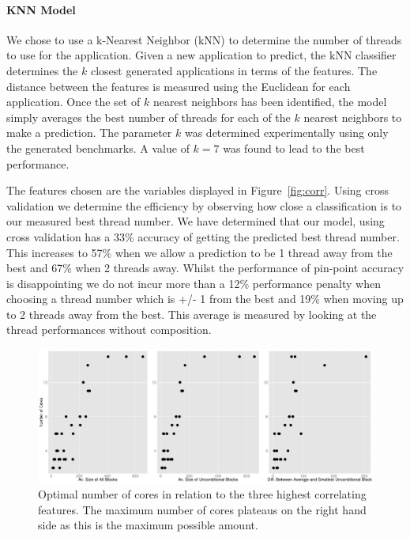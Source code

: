 \vspace{2mm}

\paragraph{KNN Model}

We chose to use a k-Nearest Neighbor (kNN) to determine the number of threads to use for the application.
Given a new application to predict, the kNN classifier determines the $k$ closest generated applications in terms of the features.
The distance between the features is measured using the Euclidean for each application.
Once the set of $k$ nearest neighbors has been identified, the model simply averages the best number of threads for each of the $k$ nearest neighbors to make a prediction.
The parameter $k$ was determined experimentally using only the generated benchmarks.
A value of $k=7$ was found to lead to the best performance.

The features chosen are the variables displayed in Figure~\ref{fig:corr}.
Using cross validation we determine the efficiency by observing how close a classification is to our measured best thread number.
We have determined that our model, using cross validation has a 33\% accuracy of getting the predicted best thread number.
This increases to 57\% when we allow a prediction to be 1 thread away from the best and 67\% when 2 threads away.
Whilst the performance of pin-point accuracy is disappointing we do not incur more than a 12\% performance penalty when choosing a thread number which is +/- 1 from the best and 19\% when moving up to 2 threads away from the best.
This average is measured by looking at the thread performances without composition.

\begin{figure}
  \center
  \includegraphics[width=1\textwidth]{streamit-paper/graphics/lineargraphs.pdf}
  \caption{Optimal number of cores in relation to the three highest correlating features. The maximum number of cores plateaus on the right hand side as this is the maximum possible amount.}\label{fig:maxav}
\end{figure}
